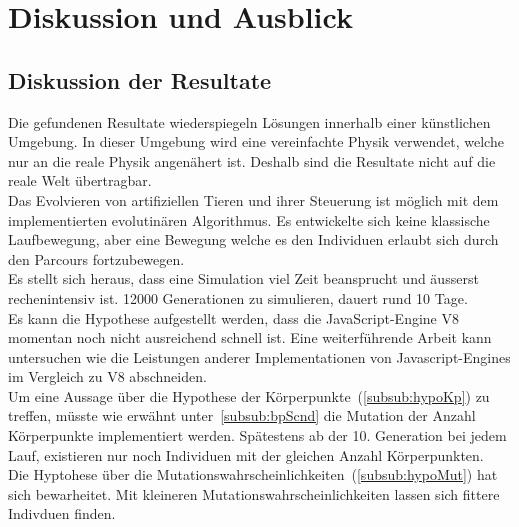 %
%


\chapter{Diskussion und Ausblick\label{chap:perspective}}

  \section{Diskussion der Resultate\label{sec:diskRes}}
    Die gefundenen Resultate wiederspiegeln Lösungen innerhalb einer künstlichen Umgebung.
    In dieser Umgebung wird eine vereinfachte Physik verwendet, welche nur an die reale Physik angenähert ist.
    Deshalb sind die Resultate nicht auf die reale Welt übertragbar.
    \\
    Das Evolvieren von artifiziellen Tieren und ihrer Steuerung ist möglich mit dem implementierten evolutinären Algorithmus.
    Es entwickelte sich keine klassische Laufbewegung, aber eine Bewegung welche es den Individuen erlaubt sich durch den Parcours fortzubewegen.
    \\
    Es stellt sich heraus, dass eine Simulation viel Zeit beansprucht und äusserst rechenintensiv ist.
    12000 Generationen zu simulieren, dauert rund 10 Tage. \\
    Es kann die Hypothese aufgestellt werden, dass die JavaScript-Engine V8 momentan noch nicht ausreichend schnell ist.
    Eine weiterführende Arbeit kann untersuchen wie die Leistungen anderer Implementationen von Javascript-Engines im
    Vergleich zu V8 abschneiden.
    \\
    Um eine Aussage über die Hypothese der Körperpunkte~(\vref{subsub:hypoKp}) zu treffen,
    müsste wie erwähnt unter~\vref{subsub:bpScnd} die Mutation der Anzahl Körperpunkte implementiert werden.
    Spätestens ab der 10. Generation bei jedem Lauf, existieren nur noch Individuen mit der gleichen Anzahl Körperpunkten.
    \\
    Die Hyptohese über die Mutationswahrscheinlichkeiten~(\vref{subsub:hypoMut}) hat sich bewarheitet.
    Mit kleineren Mutationswahrscheinlichkeiten lassen sich fittere Indivduen finden.
    
